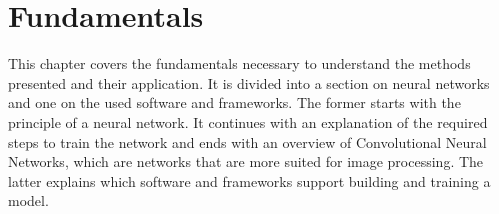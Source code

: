 \chapter{Fundamentals}
This chapter covers the fundamentals necessary to understand the methods presented and their application.
It is divided into a section on neural networks and one on the used software and frameworks.
The former starts with the principle of a neural network.
It continues with an explanation of the required steps to train the network and ends with an overview of Convolutional Neural Networks, which are networks that are more suited for image processing.
The latter explains which software and frameworks support building and training a model.


